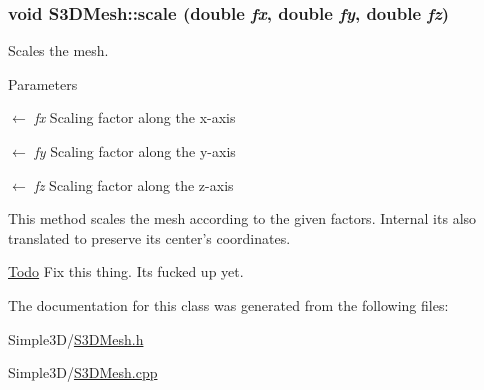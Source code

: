 \hypertarget{class_s3_d_mesh_ad1de35530a123dbb515e37afc8ecc0e3}{
\subsubsection[{scale}]{\setlength{\rightskip}{0pt plus 5cm}void S3DMesh::scale (double {\em fx}, \/  double {\em fy}, \/  double {\em fz})}}
\label{class_s3_d_mesh_ad1de35530a123dbb515e37afc8ecc0e3}


Scales the mesh. 


\begin{DoxyParams}{Parameters}
\item[\mbox{$\leftarrow$} {\em fx}]Scaling factor along the x-\/axis \item[\mbox{$\leftarrow$} {\em fy}]Scaling factor along the y-\/axis \item[\mbox{$\leftarrow$} {\em fz}]Scaling factor along the z-\/axis\end{DoxyParams}
This method scales the mesh according to the given factors. Internal its also translated to preserve its center's coordinates. \begin{Desc}
\item[\hyperlink{todo__todo000001}{Todo}]Fix this thing. Its fucked up yet. \end{Desc}


The documentation for this class was generated from the following files:\begin{DoxyCompactItemize}
\item 
Simple3D/\hyperlink{_s3_d_mesh_8h}{S3DMesh.h}\item 
Simple3D/\hyperlink{_s3_d_mesh_8cpp}{S3DMesh.cpp}\end{DoxyCompactItemize}

